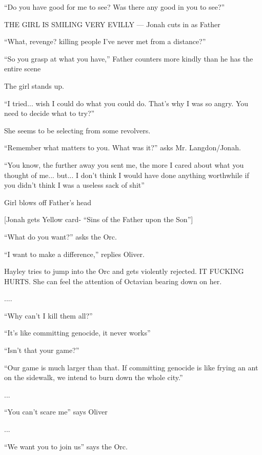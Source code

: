 ``Do you have good for me to see?  Was there any good in you to see?''



THE GIRL IS SMILING VERY EVILLY --- Jonah cuts in as Father



``What, revenge? killing people I've never met from a distance?''

``So you grasp at what you have,'' Father counters more kindly than he has the entire scene

The girl stands up.

``I tried... wish I could do what you could do. That's why I was so angry.  You need to decide what to try?''

She seems to be selecting from some revolvers.

``Remember what matters to you.  What was it?'' asks Mr. Langdon/Jonah.

``You know, the further away you sent me, the more I cared about what you thought of me... but... I don't think I would have done anything worthwhile if you didn't think I was a useless sack of shit''

Girl blows off Father's head



{[}Jonah gets Yellow card- ``Sins of the Father upon the Son''{]}




``What do you want?'' asks the Orc.

``I want to make a difference,'' replies Oliver.



Hayley tries to jump into the Orc and gets violently rejected.  IT FUCKING HURTS.  She can feel the attention of Octavian bearing down on her.

....

``Why can't I kill them all?''

``It's like committing genocide, it never works''

``Isn't that your game?''

``Our game is much larger than that. If committing genocide is like frying an ant on the sidewalk, we intend to burn down the whole city.''

...

``You can't scare me'' says Oliver

...

``We want you to join us'' says the Orc.

